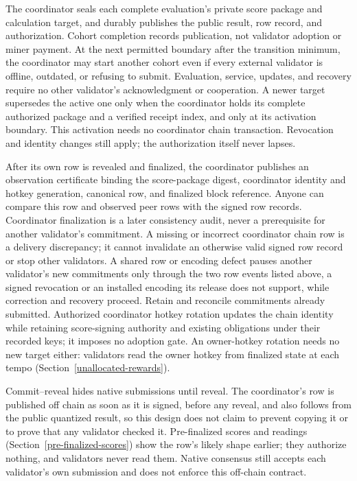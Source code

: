 The coordinator seals each complete evaluation's private score package and
calculation target, and durably publishes the public result, row record, and
authorization. Cohort completion records publication, not
validator adoption or miner payment. At the next permitted boundary after the
transition minimum, the coordinator may start another cohort even if every
external validator is offline, outdated, or refusing to submit. Evaluation,
service, updates, and recovery require no other validator's acknowledgment or
cooperation. A newer target supersedes the active one only when the coordinator
holds its complete authorized package and a verified receipt index, and only at
its activation boundary. This activation needs no coordinator chain
transaction. Revocation and identity changes still apply; the authorization
itself never lapses.

After its own row is revealed and finalized, the coordinator publishes an
observation certificate binding the score-package digest, coordinator identity
and hotkey generation, canonical row, and finalized block reference. Anyone can
compare this row and observed peer rows with the signed row records.
Coordinator finalization is a later consistency
audit, never a prerequisite for another validator's commitment. A missing or
incorrect coordinator chain row is a delivery discrepancy; it cannot invalidate
an otherwise valid signed row record or stop other validators. A shared row or
encoding defect pauses another validator's new commitments only through the
two row events listed above, a signed revocation or an installed encoding its
release does not support, while correction and recovery proceed. Retain and reconcile commitments already
submitted. Authorized coordinator hotkey rotation updates the chain identity
while retaining score-signing authority and existing obligations under their
recorded keys; it imposes no adoption gate. An owner-hotkey rotation needs no
new target either: validators read the owner hotkey from finalized state at each
tempo (Section~\ref{unallocated-rewards}).

Commit--reveal hides native submissions until reveal. The coordinator's row is
published off chain as soon as it is signed, before any reveal, and also
follows from the public quantized result, so this design does not claim to
prevent copying it or to prove that any validator checked it. Pre-finalized
scores and readings (Section~\ref{pre-finalized-scores}) show the row's likely
shape earlier; they authorize nothing, and validators never read them. Native consensus
still accepts each validator's own submission and does not enforce this
off-chain contract.

